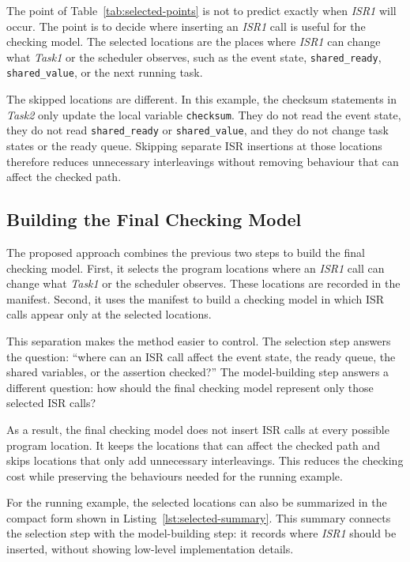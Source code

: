 The point of Table~\ref{tab:selected-points} is not to predict exactly when \textit{ISR1} will occur. The point is to decide where inserting an \textit{ISR1} call is useful for the checking model. The selected locations are the places where \textit{ISR1} can change what \textit{Task1} or the scheduler observes, such as the event state, \texttt{shared\_ready}, \texttt{shared\_value}, or the next running task.

The skipped locations are different. In this example, the checksum statements in
\textit{Task2} only update the local variable \texttt{checksum}. They do not read the event state, they do not read \texttt{shared\_ready} or \texttt{shared\_value}, and they do not change task states or the ready queue. Skipping separate ISR insertions at those locations therefore reduces unnecessary interleavings without removing behaviour that can affect the checked path.

\subsection{Building the Final Checking Model}
\label{sec:method-final-model}

The proposed approach combines the previous two steps to build the final checking model. First, it selects the program locations where an \textit{ISR1} call can change what \textit{Task1} or the scheduler observes. These locations are recorded in the manifest. Second, it uses the manifest to build a checking model in which ISR calls appear only at the selected locations.

This separation makes the method easier to control. The selection step answers the question: ``where can an ISR call affect the event state, the ready queue, the shared variables, or the assertion checked?'' The model-building step answers a different question: how should the final checking model represent only those selected ISR calls?

As a result, the final checking model does not insert ISR calls at every possible program location. It keeps the locations that can affect the checked path and skips locations that only add unnecessary interleavings. This reduces the checking cost while preserving the behaviours needed for the running example.

For the running example, the selected locations can also be summarized in the compact form
shown in Listing~\ref{lst:selected-summary}. This summary connects the selection step with
the model-building step: it records where \textit{ISR1} should be inserted, without showing
low-level implementation details.

